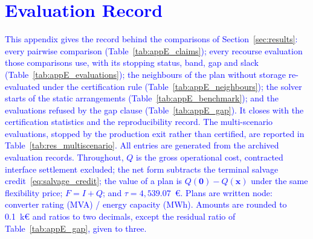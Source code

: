 \clearpage
\section{\textcolor{blue}{Evaluation Record}}
\label{app:results}

\textcolor{blue}{
    This appendix gives the record behind the comparisons of Section~\ref{sec:results}: every pairwise comparison (Table~\ref{tab:appE_claims}); every recourse evaluation those comparisons use, with its stopping status, band, gap and slack (Table~\ref{tab:appE_evaluations}); the neighbours of the plan without storage re-evaluated under the certification rule (Table~\ref{tab:appE_neighbours}); the solver starts of the static arrangements (Table~\ref{tab:appE_benchmark}); and the evaluations refused by the gap clause (Table~\ref{tab:appE_gap}). It closes with the certification statistics and the reproducibility record. The multi-scenario evaluations, stopped by the production exit rather than certified, are reported in Table~\ref{tab:res_multiscenario}. All entries are generated from the archived evaluation records. Throughout, $Q$ is the gross operational cost, contracted interface settlement excluded; the net form subtracts the terminal salvage credit~\eqref{eq:salvage_credit}; the value of a plan is $Q(\boldsymbol{0}) - Q(\boldsymbol{x})$ under the same flexibility price; $F = I + Q$; and $\tau = 4{,}539.07$~\euro{}. Plans are written node: converter rating (MVA) / energy capacity (MWh). Amounts are rounded to 0.1~k\euro{} and ratios to two decimals, except the residual ratio of Table~\ref{tab:appE_gap}, given to three.
}

